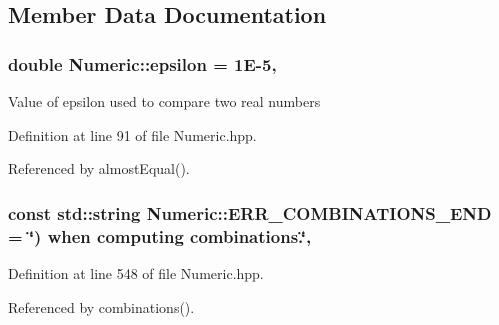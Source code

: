\subsection{Member Data Documentation}
\hypertarget{classmultiscale_1_1Numeric_ac66cc2092ff149af068ac93aa3a6cc51}{
\subsubsection[{epsilon}]{\setlength{\rightskip}{0pt plus 5cm}double Numeric\-::epsilon = 1\-E-\/5\hspace{0.3cm}{\ttfamily [static]}, {\ttfamily [private]}}}\label{classmultiscale_1_1Numeric_ac66cc2092ff149af068ac93aa3a6cc51}
Value of epsilon used to compare two real numbers 

Definition at line 91 of file Numeric.\-hpp.



Referenced by almost\-Equal().

\hypertarget{classmultiscale_1_1Numeric_a5f24aa1c11749deac42726f349131db5}{
\subsubsection[{E\-R\-R\-\_\-\-C\-O\-M\-B\-I\-N\-A\-T\-I\-O\-N\-S\-\_\-\-E\-N\-D}]{\setlength{\rightskip}{0pt plus 5cm}const std\-::string Numeric\-::\-E\-R\-R\-\_\-\-C\-O\-M\-B\-I\-N\-A\-T\-I\-O\-N\-S\-\_\-\-E\-N\-D = \char`\"{}) when computing combinations.\char`\"{}\hspace{0.3cm}{\ttfamily [static]}, {\ttfamily [private]}}}\label{classmultiscale_1_1Numeric_a5f24aa1c11749deac42726f349131db5}


Definition at line 548 of file Numeric.\-hpp.



Referenced by combinations().

